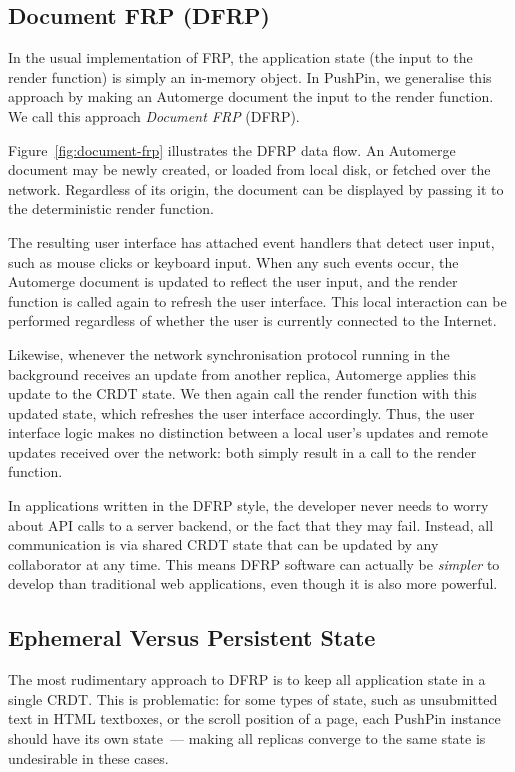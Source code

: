 \documentclass[sigplan,10pt]{acmart}
\begin{document}
\subsection{Document FRP (DFRP)}

In the usual implementation of FRP, the application state (the input to the render function) is simply an in-memory object.
In PushPin, we generalise this approach by making an Automerge document the input to the render function.
We call this approach \emph{Document FRP} (DFRP).

Figure~\ref{fig:document-frp} illustrates the DFRP data flow.
An Automerge document may be newly created, or loaded from local disk, or fetched over the network.
Regardless of its origin, the document can be displayed by passing it to the deterministic render function.

The resulting user interface has attached event handlers that detect user input, such as mouse clicks or keyboard input.
When any such events occur, the Automerge document is updated to reflect the user input, and the render function is called again to refresh the user interface.
This local interaction can be performed regardless of whether the user is currently connected to the Internet.

Likewise, whenever the network synchronisation protocol running in the background receives an update from another replica, Automerge applies this update to the CRDT state.
We then again call the render function with this updated state, which refreshes the user interface accordingly. Thus, the user interface logic makes no distinction between a local user's updates and remote updates received over the network: both simply result in a call to the render function.

In applications written in the DFRP style, the developer never needs to worry about API calls to a server backend, or the fact that they may fail. Instead, all communication is via shared CRDT state that can be updated by any collaborator at any time. This means DFRP software can actually be \emph{simpler} to develop than traditional web applications, even though it is also more powerful.

\subsection{Ephemeral Versus Persistent State}

The most rudimentary approach to DFRP is to keep all application state in a single CRDT. This is problematic: for some types of state, such as unsubmitted text in HTML textboxes, or the scroll position of a page, each PushPin instance should have its own state~--- making all replicas converge to the same state is undesirable in these cases.
\end{document}

